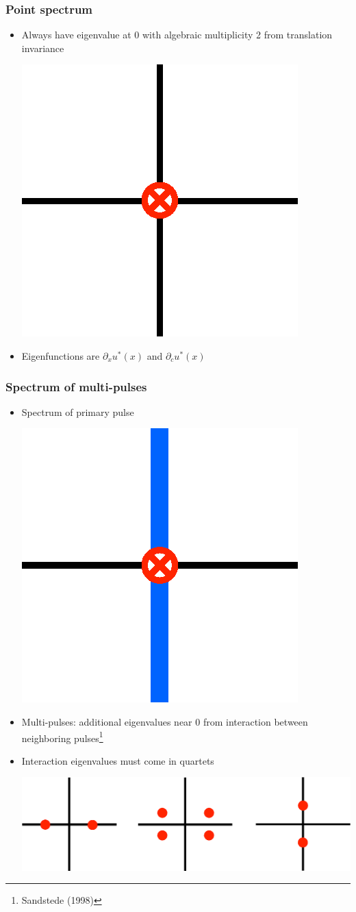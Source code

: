 \documentclass[16pt]{beamer}
\begin{document}
\begin{frame}
	\frametitle{Point spectrum}
	\begin{itemize}
		\item Always have eigenvalue at 0 with algebraic multiplicity 2 from translation invariance
		\vspace{0.5cm}
		\begin{center}
			\includegraphics[width=0.3\linewidth]{images/eigsingle.eps}
		\end{center}
		\vspace{0.5cm}
		\item Eigenfunctions are $\partial_x u^*(x)$ and $\partial_c u^*(x)$
	\end{itemize}
\end{frame}

\begin{frame}
	\frametitle{Spectrum of multi-pulses}
	\begin{itemize}
	\item Spectrum of primary pulse
		\begin{center}
			\includegraphics[width=0.2\linewidth]{images/eigsinglepulse.eps}
		\end{center}
	\item Multi-pulses: additional eigenvalues near 0 from interaction between neighboring pulses\footnote{Sandstede (1998)}
 	\item Interaction eigenvalues must come in quartets
		\begin{center}
			\includegraphics[width=0.8\linewidth]{images/eigdouble2}
		\end{center}
	\end{itemize}
\end{frame}
\end{document}
